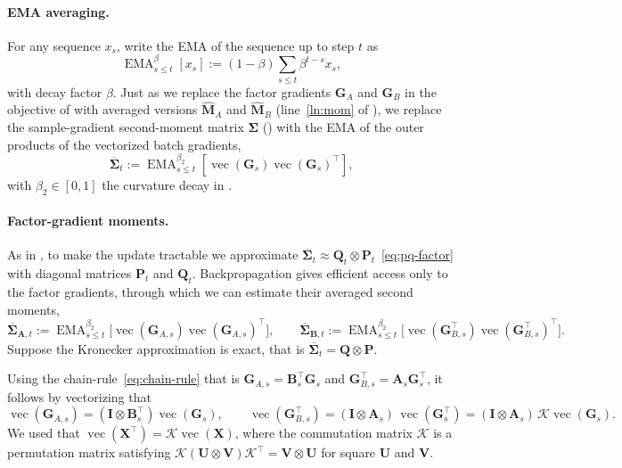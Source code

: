 \documentclass[11pt]{article}
\renewcommand{\vec}{\operatorname{vec}}
\newcommand{\mat}[1]{\bm{#1}}
\DeclareMathOperator{\EMA}{EMA}
\begin{document}
\paragraph{EMA averaging.} For any sequence $x_s$, write the EMA of the sequence up to step $t$ as
\[
  \EMA^{\beta}_{s\le t}[x_s]:=(1-\beta)\sum_{s\le t}\beta^{t-s} x_s,
\]
with decay factor $\beta$. Just as we replace the factor gradients $\mat{G}_A$ and $\mat{G}_B$ in the objective of  with averaged versions $\widehat{\mat{M}}_A$ and $\widehat{\mat{M}}_B$ (line~\ref{ln:mom} of ), we replace the sample-gradient second-moment matrix $\mat{\Sigma}$ () with the EMA of the outer products of the vectorized batch gradients,
\[
  \overline{\mat{\Sigma}}_t:=\EMA^{\beta_2}_{s\le t}[\vec(\mat{G}_s) \vec(\mat{G}_s)^\top],
\]
with $\beta_2\in [0, 1]$ the curvature decay in .

\paragraph{Factor-gradient moments.}
As in , to make the update tractable we approximate $\overline{\mat{\Sigma}}_t \approx \mat{Q}_t \otimes \mat{P}_t$~\eqref{eq:pq-factor} with diagonal matrices $\mat{P}_t$ and $\mat{Q}_t$. Backpropagation gives efficient access only to the factor gradients, through which we can estimate their averaged second moments,
\begin{equation} \label{eq:factor-moments}
  \overline{\mat{\Sigma}}_{\mat{A},t}:=\EMA^{\beta_2}_{s\le t}\bigl[\vec(\mat{G}_{A,s})\vec(\mat{G}_{A,s})^\top\bigr],
  \qquad
  \overline{\mat{\Sigma}}_{\mat{B},t}:=\EMA^{\beta_2}_{s\le t}\bigl[\vec(\mat{G}_{B,s}^\top)\vec(\mat{G}_{B,s}^\top)^\top\bigr].
\end{equation}
Suppose the Kronecker approximation is exact, that is $\overline{\mat{\Sigma}}_t = \mat{Q} \otimes \mat{P}$.

Using the chain-rule~\eqref{eq:chain-rule} that is $\mat{G}_{A,s}=\mat{B}_s^\top \mat{G}_s$ and $\mat{G}_{B,s}^\top = \mat{A}_s \mat{G}_s^\top$, it follows by vectorizing that
\[
  \vec(\mat{G}_{A,s}) = (\mat{I} \otimes \mat{B}_s^\top)\vec(\mat{G}_s),
  \qquad
  \vec(\mat{G}_{B,s}^\top) = (\mat{I} \otimes \mat{A}_s)\,\vec(\mat{G}_s^\top)
    = (\mat{I} \otimes \mat{A}_s)\,\mathcal{K}\vec(\mat{G}_s).
\]
 We used that $\vec(\mat{X}^\top)=\mathcal{K}\vec(\mat{X})$, where the commutation matrix $\mathcal{K}$ is a permutation matrix satisfying $\mathcal{K}(\mat{U} \otimes \mat{V})\mathcal{K}^\top = \mat{V} \otimes \mat{U}$ for square $\mat{U}$ and $\mat{V}$.
\end{document}
